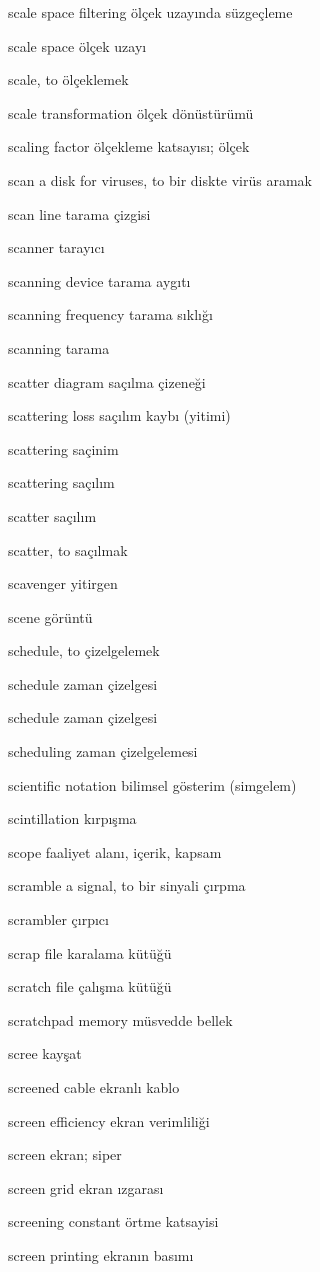 \documentclass[12pt,fleqn]{article}\usepackage{../../common}
\begin{document}
scale space filtering ölçek uzayında süzgeçleme

scale space ölçek uzayı

scale, to ölçeklemek

scale transformation ölçek dönüstürümü

scaling factor ölçekleme katsayısı; ölçek

scan a disk for viruses, to bir diskte virüs aramak

scan line tarama çizgisi

scanner tarayıcı

scanning device tarama aygıtı

scanning frequency tarama sıklığı

scanning tarama

scatter diagram saçılma çizeneği

scattering loss saçılım kaybı (yitimi)

scattering saçinim

scattering saçılım

scatter saçılım

scatter, to saçılmak

scavenger yitirgen

scene görüntü

schedule, to çizelgelemek

schedule zaman çizelgesi

schedule zaman çizelgesi

scheduling zaman çizelgelemesi

scientific notation bilimsel gösterim (simgelem)

scintillation kırpışma

scope faaliyet alanı, içerik, kapsam

scramble a signal, to bir sinyali çırpma

scrambler çırpıcı

scrap file karalama kütüğü

scratch file çalışma kütüğü

scratchpad memory müsvedde bellek

scree kayşat

screened cable ekranlı kablo

screen efficiency ekran verimliliği

screen ekran; siper

screen grid ekran ızgarası

screening constant örtme katsayisi

screen printing ekranın basımı
\end{document}
